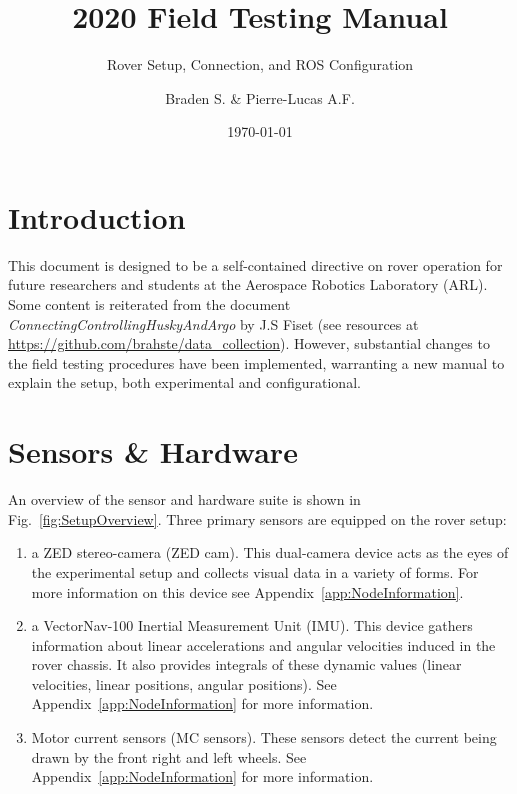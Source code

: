 \documentclass[
	12pt, %
]{fphw}
\title{2020 Field Testing Manual} %
\subtitle{Rover Setup, Connection, and ROS Configuration}
\author{Braden S. \& Pierre-Lucas A.F.} %
\date{\today} %
\institute{Areospace Robotics Laboratory} %
\begin{document}
\maketitle %


\section{Introduction}

This document is designed to be a self-contained directive on rover operation for future researchers and students at the Aerospace Robotics Laboratory (ARL). Some content is reiterated from the document \textit{ConnectingControllingHuskyAndArgo} by J.S Fiset (see resources at \url{https://github.com/brahste/data_collection}). However, substantial changes to the field testing procedures have been implemented, warranting a new manual to explain the setup, both experimental and configurational.


\section{Sensors \& Hardware}
\label{sec:SensorsAndHardware}

An overview of the sensor and hardware suite is shown in Fig.~\ref{fig:SetupOverview}. Three primary sensors are equipped on the rover setup:
\begin{enumerate}
	\item a ZED stereo-camera (ZED cam). This dual-camera device acts as the eyes of the experimental setup and collects visual data in a variety of forms. For more information on this device see Appendix~\ref{app:NodeInformation}.
	\item a VectorNav-100 Inertial Measurement Unit (IMU). This device gathers information about linear accelerations and angular velocities  induced in the rover chassis. It also provides integrals of these dynamic values (linear velocities, linear positions, angular positions). See Appendix~\ref{app:NodeInformation} for more information.
	\item Motor current sensors (MC sensors). These sensors detect the current being drawn by the front right and left wheels. See Appendix~\ref{app:NodeInformation} for more information.
\end{enumerate}
\end{document}
